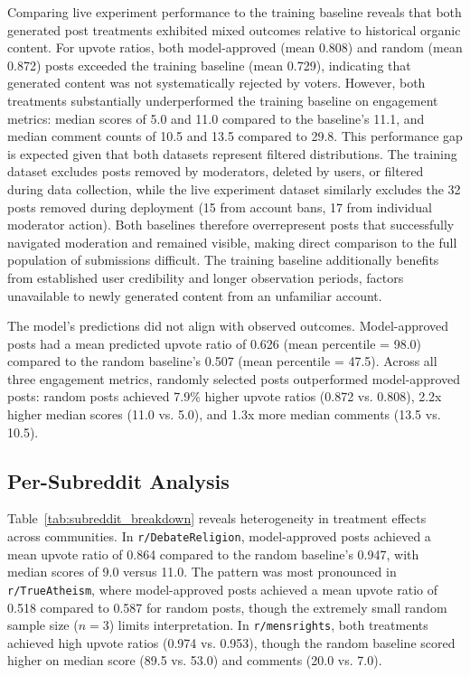 Comparing live experiment performance to the training baseline reveals that both generated post treatments exhibited mixed outcomes relative to historical organic content. For upvote ratios, both model-approved (mean 0.808) and random (mean 0.872) posts exceeded the training baseline (mean 0.729), indicating that generated content was not systematically rejected by voters. However, both treatments substantially underperformed the training baseline on engagement metrics: median scores of 5.0 and 11.0 compared to the baseline's 11.1, and median comment counts of 10.5 and 13.5 compared to 29.8. This performance gap is expected given that both datasets represent filtered distributions. The training dataset excludes posts removed by moderators, deleted by users, or filtered during data collection, while the live experiment dataset similarly excludes the 32 posts removed during deployment (15 from account bans, 17 from individual moderator action). Both baselines therefore overrepresent posts that successfully navigated moderation and remained visible, making direct comparison to the full population of submissions difficult. The training baseline additionally benefits from established user credibility and longer observation periods, factors unavailable to newly generated content from an unfamiliar account.

The model's predictions did not align with observed outcomes. Model-approved posts had a mean predicted upvote ratio of 0.626 (mean percentile = 98.0) compared to the random baseline's 0.507 (mean percentile = 47.5). Across all three engagement metrics, randomly selected posts outperformed model-approved posts: random posts achieved 7.9\% higher upvote ratios (0.872 vs. 0.808), 2.2x higher median scores (11.0 vs. 5.0), and 1.3x more median comments (13.5 vs. 10.5).

\subsection{Per-Subreddit Analysis}
\label{subsec:per_subreddit_live}

Table~\ref{tab:subreddit_breakdown} reveals heterogeneity in treatment effects across communities. In \verb!r/DebateReligion!, model-approved posts achieved a mean upvote ratio of 0.864 compared to the random baseline's 0.947, with median scores of 9.0 versus 11.0. The pattern was most pronounced in \verb!r/TrueAtheism!, where model-approved posts achieved a mean upvote ratio of 0.518 compared to 0.587 for random posts, though the extremely small random sample size ($n=3$) limits interpretation. In \verb!r/mensrights!, both treatments achieved high upvote ratios (0.974 vs. 0.953), though the random baseline scored higher on median score (89.5 vs. 53.0) and comments (20.0 vs. 7.0).

